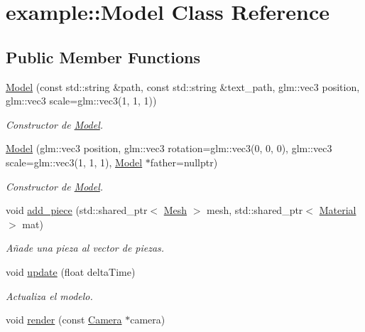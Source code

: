 \hypertarget{classexample_1_1_model}{}\section{example\+::Model Class Reference}
\label{classexample_1_1_model}
\subsection*{Public Member Functions}
\begin{DoxyCompactItemize}
\item 
\mbox{\hyperlink{classexample_1_1_model_acdfb26d4a8616aaaec055e1da4ce4331}{Model}} (const std\+::string \&path, const std\+::string \&text\+\_\+path, glm\+::vec3 position, glm\+::vec3 scale=glm\+::vec3(1, 1, 1))
\begin{DoxyCompactList}\small\item\em Constructor de \mbox{\hyperlink{classexample_1_1_model}{Model}}. \end{DoxyCompactList}\item 
\mbox{\hyperlink{classexample_1_1_model_ae763def759a07586ab7cd6dbffcd3557}{Model}} (glm\+::vec3 position, glm\+::vec3 rotation=glm\+::vec3(0, 0, 0), glm\+::vec3 scale=glm\+::vec3(1, 1, 1), \mbox{\hyperlink{classexample_1_1_model}{Model}} $\ast$father=nullptr)
\begin{DoxyCompactList}\small\item\em Constructor de \mbox{\hyperlink{classexample_1_1_model}{Model}}. \end{DoxyCompactList}\item 
void \mbox{\hyperlink{classexample_1_1_model_a32d1ef428a575d9204b8702f267b163e}{add\+\_\+piece}} (std\+::shared\+\_\+ptr$<$ \mbox{\hyperlink{classexample_1_1_mesh}{Mesh}} $>$ mesh, std\+::shared\+\_\+ptr$<$ \mbox{\hyperlink{classexample_1_1_material}{Material}} $>$ mat)
\begin{DoxyCompactList}\small\item\em Añade una pieza al vector de piezas. \end{DoxyCompactList}\item 
void \mbox{\hyperlink{classexample_1_1_model_a6070718d4527d2e659241097b3bed3b6}{update}} (float delta\+Time)
\begin{DoxyCompactList}\small\item\em Actualiza el modelo. \end{DoxyCompactList}\item 
void \mbox{\hyperlink{classexample_1_1_model_a685a05967dbfc7204e501f5534553a54}{render}} (const \mbox{\hyperlink{classexample_1_1_camera}{Camera}} $\ast$camera)

\end{DoxyCompactItemize}
